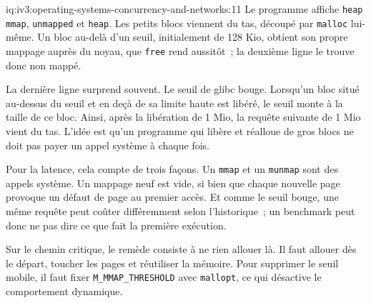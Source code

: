 \begin{solution}{iq:iv3:operating-systems-concurrency-and-networks:11}
Le programme affiche \texttt{heap mmap}, \texttt{unmapped} et \texttt{heap}. Les petits blocs viennent du tas, découpé par \texttt{malloc} lui-même. Un bloc au-delà d'un seuil, initialement de 128 Kio, obtient son propre mappage auprès du noyau, que \texttt{free} rend aussitôt~; la deuxième ligne le trouve donc non mappé.

La dernière ligne surprend souvent. Le seuil de glibc bouge. Lorsqu'un bloc situé au-dessus du seuil et en deçà de sa limite haute est libéré, le seuil monte à la taille de ce bloc. Ainsi, après la libération de 1 Mio, la requête suivante de 1 Mio vient du tas. L'idée est qu'un programme qui libère et réalloue de gros blocs ne doit pas payer un appel système à chaque fois.

Pour la latence, cela compte de trois façons. Un \texttt{mmap} et un \texttt{munmap} sont des appels système. Un mappage neuf est vide, si bien que chaque nouvelle page provoque un défaut de page au premier accès. Et comme le seuil bouge, une même requête peut coûter différemment selon l'historique~; un benchmark peut donc ne pas dire ce que fait la première exécution.

Sur le chemin critique, le remède consiste à ne rien allouer là. Il faut allouer dès le départ, toucher les pages et réutiliser la mémoire. Pour supprimer le seuil mobile, il faut fixer \texttt{M\_MMAP\_THRESHOLD} avec \texttt{mallopt}, ce qui désactive le comportement dynamique.

\end{solution}

